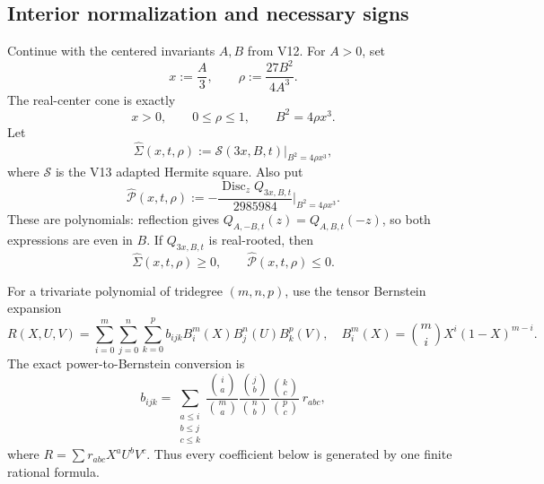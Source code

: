 \documentclass[11pt]{article}
\theoremstyle{definition}
\theoremstyle{remark}
\begin{document}
\subsection{Interior normalization and necessary signs}

Continue with the centered invariants \(A,B\) from V12.  For \(A>0\), set
\[
 x:=\frac A3,\qquad
 \rho:=\frac{27B^2}{4A^3}.
 \tag{N15.1}
\]
The real-center cone is exactly
\[
 x>0,\qquad 0\leq\rho\leq1,
 \qquad B^2=4\rho x^3.
 \tag{N15.2}
\]
Let
\[
 \widehat\Sigma(x,t,\rho):=
 \mathcal S(3x,B,t)\big|_{B^2=4\rho x^3},
 \tag{N15.3}
\]
where \(\mathcal S\) is the V13 adapted Hermite square.  Also put
\[
 \widehat{\mathcal P}(x,t,\rho):=
 -\frac{\operatorname{Disc}_z Q_{3x,B,t}}{2985984}
 \bigg|_{B^2=4\rho x^3}.
 \tag{N15.4}
\]
These are polynomials: reflection gives
\(Q_{A,-B,t}(z)=Q_{A,B,t}(-z)\), so both expressions are even in \(B\).
If \(Q_{3x,B,t}\) is real-rooted, then
\[
 \widehat\Sigma(x,t,\rho)\geq0,
 \qquad
 \widehat{\mathcal P}(x,t,\rho)\leq0.
 \tag{N15.5}
\]

For a trivariate polynomial of tridegree \((m,n,p)\), use the tensor
Bernstein expansion
\[
 R(X,U,V)=
 \sum_{i=0}^m\sum_{j=0}^n\sum_{k=0}^p
 b_{ijk}B_i^m(X)B_j^n(U)B_k^p(V),
 \quad
 B_i^m(X)=\binom miX^i(1-X)^{m-i}.
 \tag{N15.6}
\]
The exact power-to-Bernstein conversion is
\[
 b_{ijk}=
 \sum_{\substack{a\leq i\\b\leq j\\c\leq k}}
 \frac{\binom ia}{\binom ma}
 \frac{\binom jb}{\binom nb}
 \frac{\binom kc}{\binom pc}\,r_{abc},
 \tag{N15.7}
\]
where \(R=\sum r_{abc}X^aU^bV^c\).  Thus every coefficient below is
generated by one finite rational formula.
\end{document}
